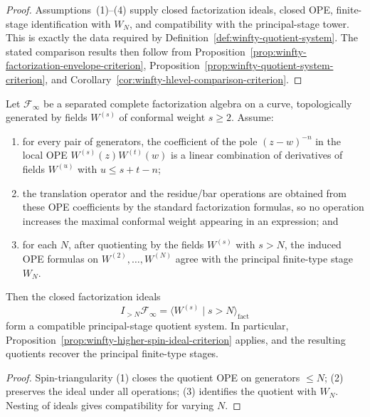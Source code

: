 \begin{proof}
Assumptions~\textup{(1)--(4)} supply closed factorization ideals, closed OPE, finite-stage identification with
$W_N$, and compatibility with the
principal-stage tower.  This is exactly the data required by
Definition~\ref{def:winfty-quotient-system}.  The stated comparison
results then follow from
Proposition~\ref{prop:winfty-factorization-envelope-criterion},
Proposition~\ref{prop:winfty-quotient-system-criterion}, and
Corollary~\ref{cor:winfty-hlevel-comparison-criterion}.
\end{proof}

\begin{proposition}
\label{prop:winfty-spin-triangular-ideals}
Let $\mathcal{F}_\infty$ be a separated complete factorization algebra
on a curve, topologically generated by fields $W^{(s)}$ of conformal
weight $s \ge 2$.  Assume:
\begin{enumerate}
\item for every pair of generators, the coefficient of the pole
  $(z-w)^{-n}$ in the local OPE
  $W^{(s)}(z)W^{(t)}(w)$ is a linear combination of derivatives of
  fields $W^{(u)}$ with $u \le s+t-n$;
\item the translation operator and the residue/bar operations are
  obtained from these OPE coefficients by the standard factorization
  formulas, so no operation increases the maximal conformal weight
  appearing in an expression; and
\item for each $N$, after quotienting by the fields $W^{(s)}$ with
  $s>N$, the induced OPE formulas on
  $W^{(2)},\dots,W^{(N)}$ agree with the principal finite-type stage
  $W_N$.
\end{enumerate}
Then the closed factorization ideals
\[
I_{>N}\mathcal{F}_\infty
= \langle W^{(s)} \mid s>N\rangle_{\mathrm{fact}}
\]
form a compatible principal-stage quotient system.  In particular,
Proposition~\ref{prop:winfty-higher-spin-ideal-criterion} applies, and
the resulting quotients recover the principal finite-type stages.
\end{proposition}

\begin{proof}
Spin-triangularity (1) closes the quotient OPE on generators $\le N$; (2) preserves the ideal under all operations; (3) identifies the quotient with $W_N$.  Nesting of ideals gives compatibility for varying $N$.
\end{proof}

